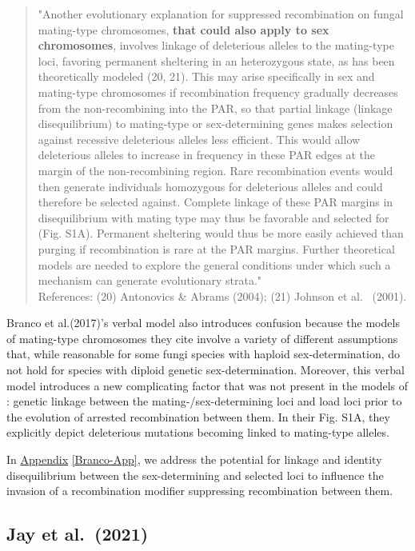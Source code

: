 \documentclass{article}
\begin{document}
\begin{appendices}
	\begin{quote}
		"Another evolutionary explanation for suppressed recombination on fungal mating-type chromosomes, {\bf that could also apply to sex chromosomes}, involves linkage of deleterious alleles to the mating-type loci, favoring permanent sheltering in an heterozygous state, as has been theoretically modeled (20, 21). This may arise specifically in sex and mating-type chromosomes if recombination frequency gradually decreases from the non-recombining into the PAR, so that partial linkage (linkage disequilibrium) to mating-type or sex-determining genes makes selection against recessive deleterious alleles less efficient. This would allow deleterious alleles to increase in frequency in these PAR edges at the margin of the non-recombining region. Rare recombination events would then generate individuals homozygous for deleterious alleles and could therefore be selected against. Complete linkage of these PAR margins in disequilibrium with mating type may thus be favorable and selected for (Fig. S1A). Permanent sheltering would thus be more easily achieved than purging if recombination is rare at the PAR margins. Further theoretical models are needed to explore the general conditions under which such a mechanism can generate evolutionary strata."\\
		\footnotesize{References: (20) Antonovics \& Abrams (2004); (21) Johnson et al.~ (2001).}
	\end{quote}

\noindent Branco et al.(2017)'s verbal model also introduces confusion because the models of mating-type chromosomes they cite involve a variety of different assumptions that, while reasonable for some fungi species with haploid sex-determination, do not hold for species with diploid genetic sex-determination. Moreover, this verbal model introduces a new complicating factor that was not present in the models of \citet{CharlesworthWall1999}: genetic linkage between the mating-/sex-determining loci and load loci prior to the evolution of arrested recombination between them. In their Fig. S1A, they explicitly depict deleterious mutations becoming linked to mating-type alleles.

In \hyperref[Branco-App]{Appendix} \ref{Branco-App}, we address the potential for linkage and identity disequilibrium between the sex-determining and selected loci to influence the invasion of a recombination modifier suppressing recombination between them.


\subsection*{Jay et al.~(2021)}


\end{appendices}
\end{document}
